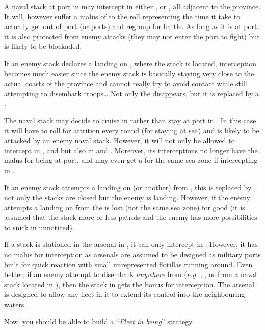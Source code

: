 \begin{exemple}
  A naval stack at port in \provinceCornwall may intercept in either
  \seazoneIrlande, \seazoneCeltique or \seazoneManche, all adjacent to the
  province. It will, however suffer a malus of  to the roll
  representing the time it take to actually get out of port (or ports) and
  regroup for battle. As long as it is at port, it is also protected from
  enemy attacks (they may not enter the port to fight) but is likely to be
  blockaded.

  If an enemy stack declares a landing on \provinceCornwall, where the stack
  is located, interception becomes much easier since the enemy stack is
  basically staying very close to the actual coasts of the province and cannot
  really try to avoid contact while still attempting to disembark troops\ldots
  Not only the  disappears, but it is replaced by a .

  \smallskip

  The naval stack may decide to cruise in \seazoneCeltique rather than stay at
  port in \provinceCornwall. In this case it will have to roll for attrition
  every round (for staying at sea) and is likely to be attacked by an enemy
  naval stack. However, it will not only be allowed to intercept in
  \seazoneIrlande, \seazoneCeltique and \seazoneManche but also in
  \seazoneGascogne and \seazoneRockall. Moreover, its interceptions no longer
  have the  malus for being at port, and may even get a 
  for the same sea zone if intercepting in \seazoneCeltique.

  If an enemy stack attempts a landing on \provinceCornwall (or another) from
  \seazoneCeltique, this  is replaced by , not only the
  stacks are closed but the enemy is landing. However, if the enemy attempts a
  landing on \provinceCornwall from \seazoneManche the  is lost (not
  the same sea zone) for good (it is assumed that the stack more or less
  patrols and the enemy has more possibilities to snick in unnoticed).

  \smallskip

  If a stack is stationed in the \villePortsmouth arsenal in
  , it can only intercept in \seazoneManche. However, it has
  no malus for interception as arsenals are assumed to be designed as military
  ports built for quick reaction with small unrepresented flotillas running
  around. Even better, if an enemy attempt to disembark \emph{anywhere} from
  \seazoneManche (\emph{e.g.} \provinceWessex, \provinceNormandie,
  \provincePicardie or \provinceKent from a naval stack located in
  \seazoneManche), then the stack in \villePortsmouth gets the 
  bonus for interception. The arsenal is designed to allow any fleet in it to
  extend its control into the neighbouring waters.

  \smallskip

  Now, you should be able to build a ``\emph{Fleet in being}'' strategy.
\end{exemple}

